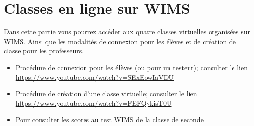 \chapter{Classes en ligne sur WIMS}

Dans cette partie vous pourrez accéder aux quatre classes virtuelles
organisées sur WIMS. Ainsi que les modalités de connexion pour les
élèves et de création de classe pour les professeurs.

\begin{itemize}
\item Procédure de connexion pour les élèves (ou pour un testeur);
  consulter le lien \url{https://www.youtube.com/watch?v=SExEowIaVDU}
\item Procédure de création d'une classe virtuelle; consulter le lien
  \url{https://www.youtube.com/watch?v=FEFQykisT0U}
\item Pour consulter les scores au test WIMS de la classe de seconde
\end{itemize}

